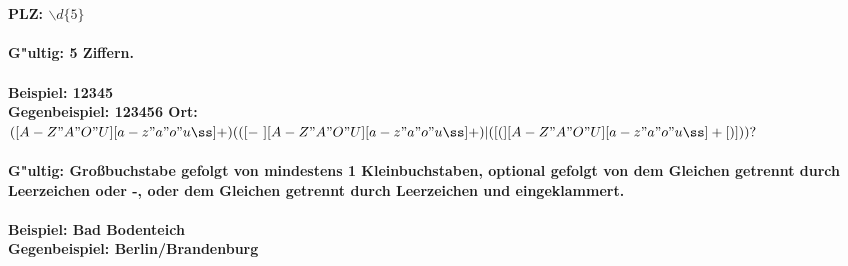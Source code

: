 \documentclass{article}
\begin{document}
\\
\\
\bf{PLZ: }\normalfont $\backslash d\lbrace5\rbrace$\\
\\
G"ultig: 5 Ziffern.\\
\\
Beispiel: 12345\\
Gegenbeispiel: 123456
\newpage
\noindent
\bf{Ort: }\normalfont $([A-Z"A"O"U][a-z"a"o"uß]+)(([-\text{ }][A-Z"A"O"U][a-z"a"o"uß]+)|( [(][A-Z"A"O"U][a-z"a"o"uß]+[)]))?$\\
\\
G"ultig: Großbuchstabe gefolgt von mindestens 1 Kleinbuchstaben, optional gefolgt von dem Gleichen getrennt durch Leerzeichen oder -, oder dem Gleichen getrennt durch Leerzeichen und eingeklammert.\\
\\
Beispiel: Bad Bodenteich\\
Gegenbeispiel: Berlin/Brandenburg\\
\\
\\
\end{document}

